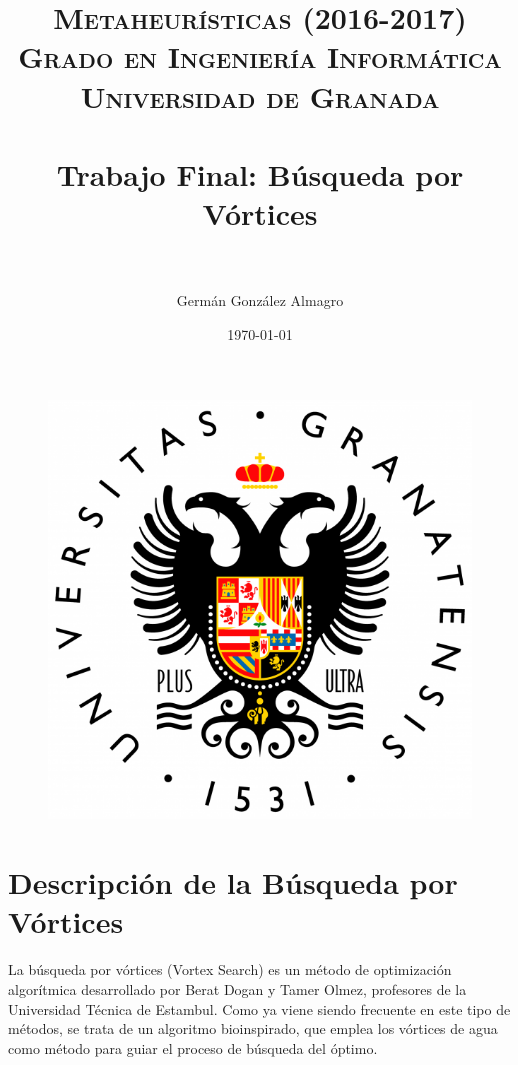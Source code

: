 \documentclass[11pt,a4paper]{article}
\title{
	\normalfont \normalsize 
	\textsc{\textbf{Metaheurísticas (2016-2017)} \\ Grado en Ingeniería Informática \\ Universidad de Granada} \\ [25pt] %
	\horrule{0.5pt} \\[0.4cm] %
	\huge Trabajo Final: Búsqueda por Vórtices  \\ %
	\horrule{2pt} \\[0.5cm] %
}
\author{Germán González Almagro} %
\begin{document}
	
	\date{\today}
	
	\maketitle
	
	\vspace{1cm}
	
	\begin{figure}[!h]
		\centering
		\includegraphics[scale=0.4]{LogoUGR.png} 
	\end{figure}
		
	\newpage
	
	\tableofcontents
	
	
	
	\newpage
	
\section{Descripción de la Búsqueda por Vórtices}

	\noindent La búsqueda por vórtices (Vortex Search) es un método de optimización algorítmica desarrollado por Berat Dogan y Tamer Olmez, profesores de la Universidad Técnica de Estambul. Como ya viene siendo frecuente en este tipo de métodos, se trata de un algoritmo bioinspirado, que emplea los vórtices de agua como método para guiar el proceso de búsqueda del óptimo.\\
	
\end{document}
